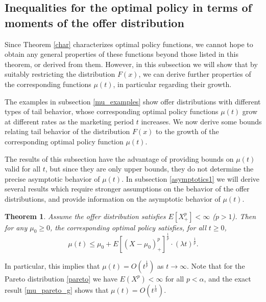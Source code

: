 \documentclass{article}
\newtheorem{thm}{Theorem}[section]
\numberwithin{equation}{section}
\begin{document}
	
	
	
	\subsection{Inequalities for the optimal policy in terms of moments of the offer distribution}
	\label{moments}
	
	Since Theorem \ref{char} characterizes 
	optimal policy functions, we cannot hope to obtain any general properties of these functions beyond those listed in this theorem, or derived from them.
	However, in this subsection we will show that by suitably restricting the distribution $F(x)$, we can derive further  properties of the corresponding functions $\mu(t)$, in particular regarding their growth.
	
	The examples in subsection \ref{mu_examples}
	show offer distributions with different 
	types of tail behavior, whose corresponding 
	optimal policy functions $\mu(t)$ grow at different rates as the marketing period $t$ increases. We now derive some  bounds  
	relating tail behavior of the distribution $F(x)$ to the growth of the 
	corresponding optimal policy function $\mu(t)$.
	
	The results of this subsection have the advantage of providing bounds on $\mu(t)$ 
	valid for all $t$, but since they are only upper bounds, they do not 
	determine the precise asymptotic behavior 
	of $\mu(t)$. In subsection \ref{asymptotics1} we will derive several results which 
	require stronger assumptions on the 
	behavior of the offer distributions, and provide information on the 
	asymptotic behavior of $\mu(t)$.
	
	
	\begin{thm}
		Assume the offer distribution satisfies $E[X_+^p]<\infty$ ($p>1$). Then for any $\mu_0\geq 0$, the corresponding optimal policy satisfies, for all $t\geq 0$,
		\begin{equation}\label{ineq1}\mu(t)\leq \mu_0+E[(X-\mu_0)_+^p]^{\frac{1}{p}}\cdot (\lambda t)^{\frac{1}{p}}.\end{equation}
	\end{thm}
	
	In particular, this implies that 
	$\mu(t)=O(t^{\frac{1}{p}})$ as $t\rightarrow \infty$. Note that for the Pareto distribution \eqref{pareto} we have $E(X^p)<\infty$
	for all $p<\alpha$, and the exact result \eqref{mu_pareto_g} shows that $\mu(t)=O(t^{\frac{1}{\alpha}})$.
	
\end{document}
